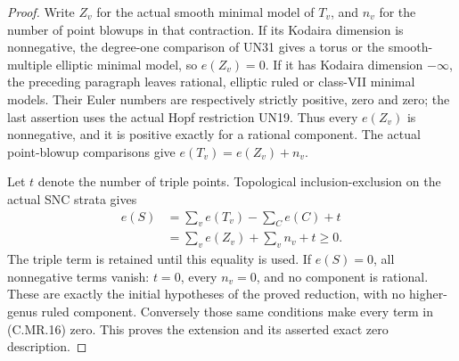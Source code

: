 \begin{proof}
Write $Z_v$ for the actual smooth minimal
model of $T_v$, and $n_v$ for the number
of point blowups in that contraction.
If its Kodaira dimension is nonnegative,
the degree-one comparison of UN31 gives
a torus or the smooth-multiple elliptic
minimal model, so $e(Z_v)=0$. If it has
Kodaira dimension $-\infty$, the preceding
paragraph leaves rational, elliptic ruled
or class-VII minimal models. Their Euler
numbers are respectively strictly positive,
zero and zero; the last assertion uses
the actual Hopf restriction UN19.
Thus every $e(Z_v)$ is nonnegative,
and it is positive exactly for a
rational component. The actual
point-blowup comparisons give
$e(T_v)=e(Z_v)+n_v$.

Let $t$ denote the number of triple
points. Topological inclusion-exclusion
on the actual SNC strata gives
\[
 \begin{aligned}
 e(S)&=\sum_v e(T_v)-\sum_C e(C)+t\\
     &=\sum_v e(Z_v)+\sum_v n_v+t
                                      \ge0.
 \end{aligned}
\tag{C.MR.16}
\]
The triple term is retained until this
equality is used. If $e(S)=0$, all
nonnegative terms vanish: $t=0$,
every $n_v=0$, and no component is
rational. These are exactly the
initial hypotheses of the proved
reduction, with no higher-genus ruled
component. Conversely those same
conditions make every term in
(C.MR.16) zero. This proves the
extension and its asserted exact
zero description.
\end{proof}
